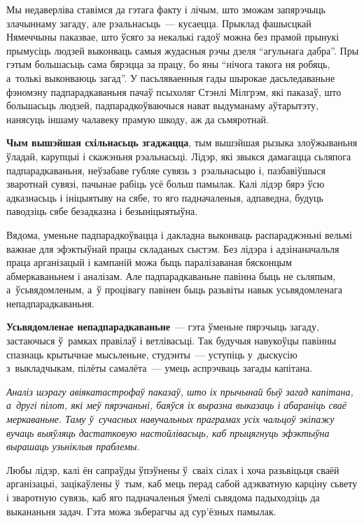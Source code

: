 Мы недаверліва ставімся да гэтага факту і лічым, што зможам запярэчыць злачыннаму загаду, але рэальнасьць~--- кусаецца. Прыклад фашысцкай Нямеччыны паказвае, што ўсяго за некалькі гадоў можна без прамой прынукі прымусіць людзей выконваць самыя жудасныя рэчы дзеля ``агульнага дабра''. Пры гэтым большасьць сама бярэцца за працу, бо яны ``нічога такога ня робяць, а~толькі выконваюць загад''. У пасьляваенныя гады шырокае дасьледаваньне фэномэну падпарадкаваньня пачаў псыхоляг Стэнлі Мілгрэм, які паказаў, што большасьць людзей, падпарадкоўваючыся нават выдуманаму аўтарытэту, нанясуць іншаму чалавеку прамую шкоду, аж да сьмяротнай.

\textbf{Чым вышэйшая схільнасьць згаджацца}, тым вышэйшая рызыка злоўжываньня ўладай, карупцыі і скажэньня рэальнасьці. Лідэр, які звыкся дамагацца сьляпога падпарадкаваньня, неўзабаве губляе сувязь з~рэальнасьцю і, пазбавіўшыся зваротнай сувязі, пачынае рабіць усё больш памылак. Калі лідэр бярэ ўсю адказнасьць і ініцыятыву на сябе, то яго падначаленыя, адпаведна, будуць паводзіць сябе безадказна і безыніцыятыўна. 


Вядома, уменьне падпарадкоўвацца і дакладна выконваць распараджэньні вельмі важнае для эфэктыўнай працы складаных сыстэм. Без лідэра і адзінаначальля праца арганізацый і кампаній можа быць паралізаваная бясконцым абмеркаваньнем і аналізам. Але падпарадкаваньне павінна быць не сьляпым, а~ўсьвядомленым, а~ў процівагу павінен быць разьвіты навык усьвядомленага непадпарадкаваньня. 

\textbf{Усьвядомленае непадпарадкаваньне}~--- гэта ўменьне пярэчыць загаду, застаючыся ў~рамках правілаў і ветлівасьці. Так будучыя навукоўцы павінны спазнаць крытычнае мысьленьне, студэнты~--- уступіць у~дыскусію з~выкладчыкам, пілёты самалёта~--- умець аспрэчваць загады капітана.

\emph{Аналіз шэрагу авіякатастрофаў паказаў, што іх прычынай быў загад капітана, а~другі пілот, які меў пярэчаньні, баяўся іх выразна выказаць і абараніць сваё меркаваньне. Таму ў~сучасных навучальных праграмах усіх чальцоў экіпажу вучаць выяўляць дастатковую настойлівасьць, каб прыцягнуць эфэктыўна вырашаць узьніклыя праблемы.}

Любы лідэр, калі ён сапраўды ўпэўнены ў~сваіх сілах і хоча разьвіцьця сваёй арганізацыі, зацікаўлены ў~тым, каб мець перад сабой адэкватную карціну сьвету і зваротную сувязь, каб яго падначаленыя ўмелі сьвядома падыходзіць да выкананьня задач. Гэта можа зьберагчы ад сур'ёзных памылак.

